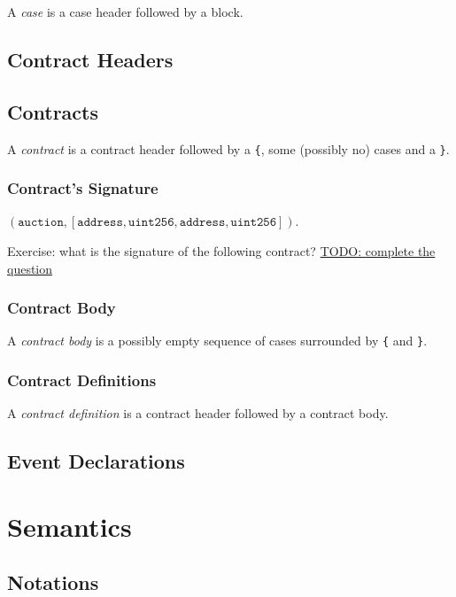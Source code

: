 \documentclass{book}
\newcommand{\todo}[1]{\underline{TODO: {#1}}}
\begin{document}
A \textit{case} is a case header followed by a block.


\section{Contract Headers}

\section{Contracts}

A \textit{contract} is a contract header followed by a \texttt{\{}, some (possibly no) cases and a \texttt{\}}.

\subsection{Contract's Signature}

$(\mathtt{auction}, [\mathtt{address}, \mathtt{uint256}, \mathtt{address}, \mathtt{uint256}])$.

Exercise: what is the signature of the following contract?
\todo{complete the question}

\subsection{Contract Body}

A \textit{contract body} is a possibly empty sequence of cases surrounded by \texttt{\{} and \texttt{\}}.

\subsection{Contract Definitions}

A \textit{contract definition} is a contract header followed by a contract body.

\section{Event Declarations}

\chapter{Semantics}

\section{Notations}
\end{document}
